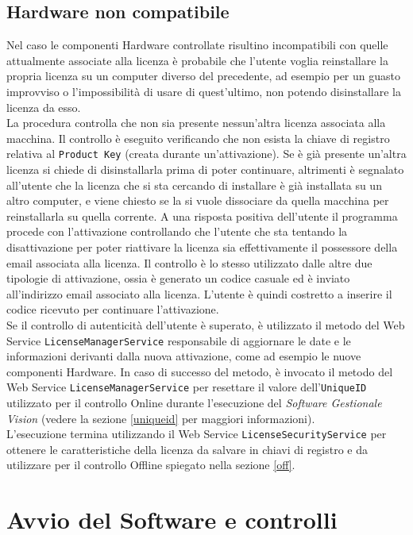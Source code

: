 \subsection{Hardware non compatibile}
\label{hnc}
Nel caso le componenti Hardware controllate risultino incompatibili con quelle attualmente associate alla licenza è probabile che l'utente voglia reinstallare la propria licenza su un computer diverso del precedente, ad esempio per un guasto improvviso o l'impossibilità di usare di quest'ultimo, non potendo disinstallare la licenza da esso. 
\\La procedura controlla che non sia presente nessun’altra licenza associata alla macchina. Il controllo è eseguito verificando che non esista la chiave di registro relativa al \texttt{Product Key} (creata durante un'attivazione). Se è già presente un’altra licenza si chiede di disinstallarla prima di poter continuare, altrimenti è segnalato all’utente che la licenza che si sta cercando di installare è già installata su un altro computer, e viene chiesto se la si vuole dissociare da quella macchina per reinstallarla su quella corrente. A una risposta positiva dell’utente il programma procede con l’attivazione controllando che l’utente che sta tentando la disattivazione per poter riattivare la licenza sia effettivamente il possessore della email associata alla licenza. Il controllo è lo stesso utilizzato dalle altre due tipologie di attivazione, ossia è generato un codice casuale ed è inviato all'indirizzo email associato alla licenza. L'utente è quindi costretto a inserire il codice ricevuto per continuare l'attivazione.
\\
Se il controllo di autenticità dell'utente è superato, è utilizzato il metodo del Web Service \texttt{LicenseManagerService} responsabile di aggiornare le date e le informazioni derivanti dalla nuova attivazione, come ad esempio le nuove componenti Hardware. In caso di successo del metodo, è invocato il metodo del Web Service \texttt{LicenseManagerService} per resettare il valore dell’\texttt{UniqueID} utilizzato per il controllo Online durante l’esecuzione del \textit{Software Gestionale Vision} (vedere la sezione \ref{uniqueid} per maggiori informazioni).\\
L’esecuzione termina utilizzando il Web Service \texttt{LicenseSecurityService} per ottenere le caratteristiche della licenza da salvare in chiavi di registro e da utilizzare per il controllo Offline spiegato nella sezione \ref{off}. 


\section{Avvio del Software e controlli}

